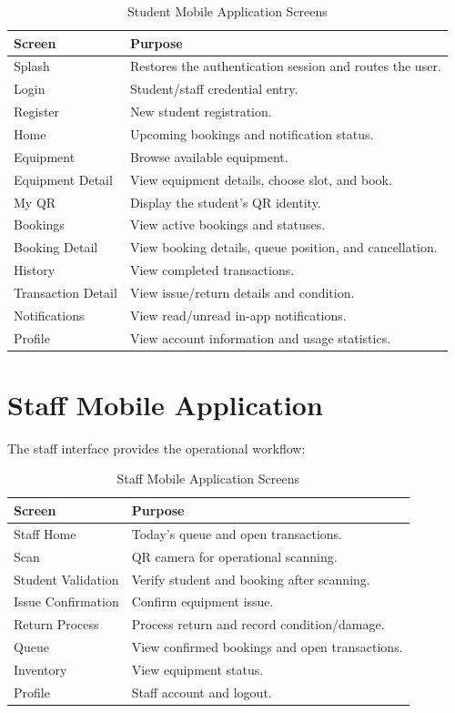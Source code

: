\documentclass[12pt,a4paper,oneside]{report}
\begin{document}
\begin{table}[H]
\centering
\small
\begin{tabular}{p{3.4cm}p{9cm}}
\toprule
\textbf{Screen} & \textbf{Purpose}\\
\midrule
Splash & Restores the authentication session and routes the user.\\
Login & Student/staff credential entry.\\
Register & New student registration.\\
Home & Upcoming bookings and notification status.\\
Equipment & Browse available equipment.\\
Equipment Detail & View equipment details, choose slot, and book.\\
My QR & Display the student's QR identity.\\
Bookings & View active bookings and statuses.\\
Booking Detail & View booking details, queue position, and cancellation.\\
History & View completed transactions.\\
Transaction Detail & View issue/return details and condition.\\
Notifications & View read/unread in-app notifications.\\
Profile & View account information and usage statistics.\\
\bottomrule
\end{tabular}
\caption{Student Mobile Application Screens}
\label{tab:student_screens}
\end{table}

\section{Staff Mobile Application}

The staff interface provides the operational workflow:

\begin{table}[H]
\centering
\small
\begin{tabular}{p{3.4cm}p{9cm}}
\toprule
\textbf{Screen} & \textbf{Purpose}\\
\midrule
Staff Home & Today's queue and open transactions.\\
Scan & QR camera for operational scanning.\\
Student Validation & Verify student and booking after scanning.\\
Issue Confirmation & Confirm equipment issue.\\
Return Process & Process return and record condition/damage.\\
Queue & View confirmed bookings and open transactions.\\
Inventory & View equipment status.\\
Profile & Staff account and logout.\\
\bottomrule
\end{tabular}
\caption{Staff Mobile Application Screens}
\label{tab:staff_screens}
\end{table}
\end{document}
